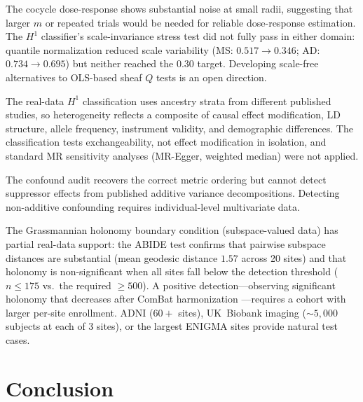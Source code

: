 \documentclass{article}
\begin{document}
The cocycle dose-response shows substantial noise at small radii, suggesting that larger $m$ or repeated trials would be needed for reliable dose-response estimation.
The $H^1$ classifier's scale-invariance stress test did not fully pass in either domain: quantile normalization reduced scale variability (MS: $0.517 \to 0.346$; AD: $0.734 \to 0.695$) but neither reached the $0.30$ target.
Developing scale-free alternatives to OLS-based sheaf $Q$ tests is an open direction.

The real-data $H^1$ classification uses ancestry strata from different published studies, so heterogeneity reflects a composite of causal effect modification, LD structure, allele frequency, instrument validity, and demographic differences.
The classification tests exchangeability, not effect modification in isolation, and standard MR sensitivity analyses (MR-Egger, weighted median) were not applied.

The confound audit recovers the correct metric ordering but cannot detect suppressor effects from published additive variance decompositions.
Detecting non-additive confounding requires individual-level multivariate data.

The Grassmannian holonomy boundary condition (subspace-valued data) has partial real-data support: the ABIDE test confirms that pairwise subspace distances are substantial (mean geodesic distance $1.57$ across 20 sites) and that holonomy is non-significant when all sites fall below the detection threshold ($n \leq 175$ vs.\ the required $\geq 500$).
A positive detection---observing significant holonomy that decreases after ComBat harmonization \citep{fortin2018harmonization}---requires a cohort with larger per-site enrollment.
ADNI ($60+$ sites), UK~Biobank imaging ($\sim\!5{,}000$ subjects at each of 3 sites), or the largest ENIGMA sites provide natural test cases.

\section{Conclusion}
\label{sec:conclusion}
\end{document}
